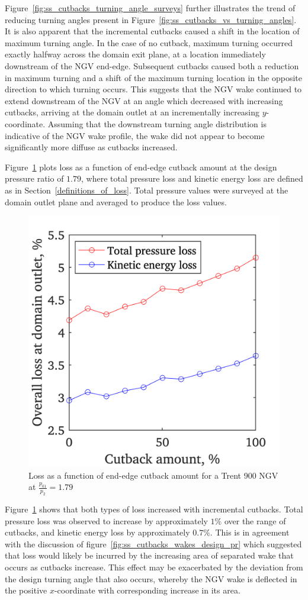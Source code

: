 \documentclass[a4paper, 11pt, oneside]{report}
\begin{document}
Figure~\ref{fig:ss_cutbacks_turning_angle_surveys} further illustrates the trend of reducing turning angles present in Figure~\ref{fig:ss_cutbacks_vs_turning_angles}. It is also apparent that the incremental cutbacks caused a shift in the location of maximum turning angle. In the case of no cutback, maximum turning occurred exactly halfway across the domain exit plane, at a location immediately downstream of the NGV end-edge. Subsequent cutbacks caused both a reduction in maximum turning and a shift of the maximum turning location in the opposite direction to which turning occurs. This suggests that the NGV wake continued to extend downstream of the NGV at an angle which decreased with increasing cutbacks, arriving at the domain outlet at an incrementally increasing $y$-coordinate. Assuming that the downstream turning angle distribution is indicative of the NGV wake profile, the wake did not appear to become significantly more diffuse as cutbacks increased.

Figure~\ref{fig:ss_cutbacks_vs_losses} plots loss as a function of end-edge cutback amount at the design pressure ratio of $1.79$, where total pressure loss and kinetic energy loss are defined as in Section~\ref{definitions_of_loss}. Total pressure values were surveyed at the domain outlet plane and averaged to produce the loss values.

\begin{figure}[H]
	\centering
	\includegraphics[width=.45\textwidth]{figs/ss_cutbacks_vs_losses.png}
	\caption{Loss as a function of end-edge cutback amount for a Trent 900 NGV at $\frac{p_{01}}{p_2}=1.79$}
    \label{fig:ss_cutbacks_vs_losses}
\end{figure}

Figure~\ref{fig:ss_cutbacks_vs_losses} shows that both types of loss increased with incremental cutbacks. Total pressure loss was observed to increase by approximately $1\%$ over the range of cutbacks, and kinetic energy loss by approximately $0.7\%$. This is in agreement with the discussion of figure~\ref{fig:ss_cutbacks_wakes_design_pr} which suggested that loss would likely be incurred by the increasing area of separated wake that occurs as cutbacks increase. This effect may be exacerbated by the deviation from the design turning angle that also occurs, whereby the NGV wake is deflected in the positive $x$-coordinate with corresponding increase in its area.
\end{document}
